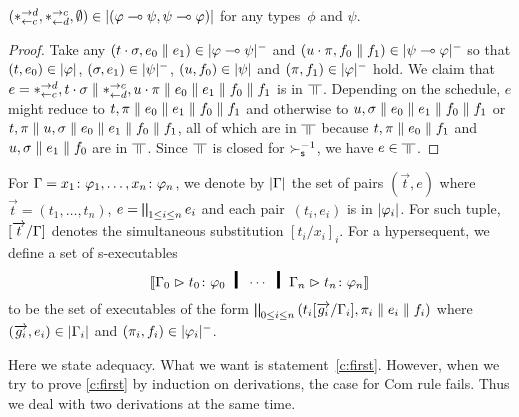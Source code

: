 \begin{proposition}
 \label{comod-type}
 $(\ast^{\rightarrow {d}}_{\leftarrow{c}},\ast^{\rightarrow {c}}_{\leftarrow{d}},\emptyset)\in|{(\varphi\multimap\psi,\psi\multimap\varphi)}|$
 for any types~$\phi$ and $\psi$.
\end{proposition}
\begin{proof}
 Take any $(t\cdot\sigma,e_{0}\parallel e_{1})\in|{\varphi\multimap\psi}|^-$
 and $(u\cdot\pi,f_{0}\parallel f_{1})\in|{\psi\multimap\varphi}|^-$ so that
 $(t, e_{0})\in|{\varphi}|$, $(\sigma,e_{1})\in|{\psi}|^-$,
 $(u, f_{0})\in|{\psi}|$ and $(\pi,f_{1})\in|{\varphi}|^-$ hold.
 We claim that $e=\ast^{\rightarrow {d}}_{\leftarrow{c}},t\cdot\sigma\parallel\ast^{\rightarrow {c}}_{\leftarrow{d}},u\cdot\pi\parallel
 e_{0}\parallel e_{1}\parallel f_{0}\parallel f_{1}$ is in
 $\bbot$.
 Depending on the schedule, $e$ might reduce to
 $ t,\pi\parallel e_{0}\parallel e_{1}\parallel f_{0}\parallel f_{1}$ and otherwise to
 $ u,\sigma\parallel e_{0}\parallel e_{1}\parallel f_{0}\parallel f_{1}$ or
 $ t,\pi\parallel u,\sigma\parallel e_{0}\parallel e_{1}\parallel f_{0}\parallel f_{1}$,
 all of which are in $\bbot$ because
 $t,\pi\parallel e_{0}\parallel f_{1}$ and
 $u,\sigma\parallel e_{1}\parallel f_{0}$ are in $\bbot$.
 Since $\bbot$ is closed for $\succ_{\mathsf s}^{-1}$,
 we have $e\in\bbot$.
\end{proof}

 \begin{proposition}
  \label{prop:w}
 \end{proposition}

For $\Gamma = {x_1} \colon{\varphi_1},\ldots,{x_n} \colon{\varphi_n}$,
we denote by $|{\Gamma}|$ the set of pairs $(\vec t,e)$ where
$\vec{t} = (t_1,\dots,t_n)$, $e = \bigparallel_{1\le i\le n} e_i$
 and each pair~$(t_i, e_i)$ is in $|{\varphi_i}|$.
For such tuple, $[\overrightarrow{t}/\Gamma]$ denotes the simultaneous substitution
$[t_i/x_i]_{i}$.
For a hypersequent, we
define a set of s-executables
\[
\semo{\G_0\tr\tj{t_0}{\phi_0}\hmid\cdots\hmid\G_n\tr\tj{t_n}{\phi_n}}
\]
to be the set of executables of the form $\bigparallel_{0\le i\le
n}\left(t_i[\overrightarrow{g_i}/\Gamma_i],\pi_i\parallel e_i\parallel f_i\right)$ where
$(\overrightarrow{g_i},e_i) \in |{\Gamma_i}|$ and $(\pi_i,f_i)\in |{\varphi_i}|^-$.

Here we state adequacy.  What we want is statement~\ref{c:first}.
However, when we try to prove \ref{c:first} by induction on derivations,
the case for Com rule fails.  Thus we deal with two derivations at the
same time.

